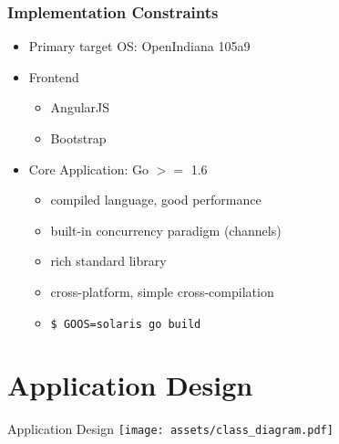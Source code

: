 \documentclass[11pt,aspectratio=169]{beamer}
\begin{document}
    \begin{frame}
        \frametitle{Implementation Constraints}
        \begin{itemize}
            \item<2-> Primary target OS: OpenIndiana 105a9
            \item<3-> Frontend \begin{itemize}
            	\item AngularJS
            	\item Bootstrap
            \end{itemize}
            \item<4-> Core Application: Go $>=$ 1.6
            \begin{itemize}
                \item<5-> compiled language, good performance
                \item<6-> built-in concurrency paradigm (channels)
                \item<7-> rich standard library
                \item<8-> cross-platform, simple cross-compilation 
                \item<9->\texttt{\$ GOOS=solaris go build}
            \end{itemize}
        \end{itemize}
        
    \end{frame}
        
   
    
    \section{Application Design}
    
    \begin{frame}[label=appdesign]{Application Design}
          \texttt{[image: assets/class\_diagram.pdf]}
    \end{frame}
       
\end{document}
